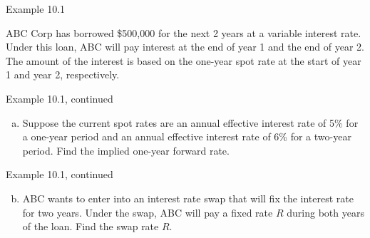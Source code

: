 \documentclass{beamer}
\begin{document}
\begin{frame}{Example 10.1}

ABC Corp has borrowed \$500,000 for the next 2 years at a variable interest rate. Under this loan, ABC will pay interest at the end of year 1 and the end of year 2. The amount of the interest is based on the one-year spot rate at the start of year 1 and year 2, respectively.

\vspace{2em}
\begin{center}
\end{center}

\vfill
\end{frame}

\begin{frame}{Example 10.1, continued}

\begin{enumerate}[a)]
\item Suppose the current spot rates are an annual effective interest rate of 5\% for a one-year period and an annual effective interest rate of 6\% for a two-year period. Find the implied one-year forward rate.
\end{enumerate}

\vspace{2em}
\begin{center}
\end{center}

\vfill
\end{frame}

\begin{frame}{Example 10.1, continued}

\begin{enumerate}[a)]
\setcounter{enumi}{1}
\item ABC wants to enter into an interest rate swap that will fix the interest rate for two years. Under the swap, ABC will pay a fixed rate $R$ during both years of the loan. Find the swap rate $R$.
\end{enumerate}

\vspace{2em}
\begin{center}
\end{center}

\vfill
\end{frame}
\end{document}

